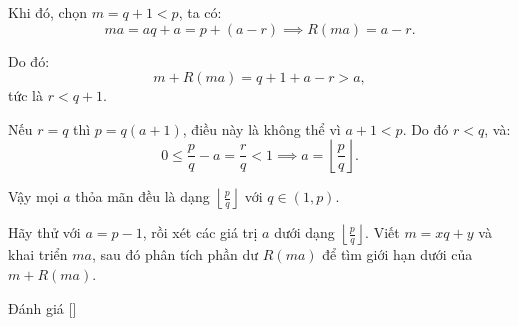 \begin{soln}
    Khi đó, chọn \( m = q + 1 < p \), ta có:
    \[
        ma = aq + a = p + (a - r) \implies R(ma) = a - r.
    \]

    Do đó:
    \[
        m + R(ma) = q + 1 + a - r > a,
    \]
    tức là \( r < q + 1 \).

    Nếu \( r = q \) thì \( p = q(a + 1) \), điều này là không thể vì \( a + 1 < p \). Do đó \( r < q \), và:
    \[
        0 \le \frac{p}{q} - a = \frac{r}{q} < 1 \implies a = \left\lfloor \frac{p}{q} \right\rfloor.
    \]

    Vậy mọi \( a \) thỏa mãn đều là dạng \( \left\lfloor \frac{p}{q} \right\rfloor \) với \( q \in (1, p) \).
\end{soln}
\fi

\ifshowhint
\begin{hint*}
    Hãy thử với \( a = p - 1 \), rồi xét các giá trị \( a \) dưới dạng \( \left\lfloor \frac{p}{q} \right\rfloor \).
    Viết \( m = xq + y \) và khai triển \( ma \), sau đó phân tích phần dư \( R(ma) \) để tìm giới hạn dưới của \( m + R(ma) \).
\end{hint*}
\fi

\ifshowremark
\begin{remark*}
    Đánh giá [\textbf{}]
\end{remark*}
\newpage
\fi
